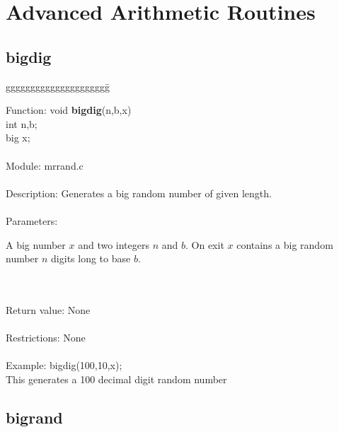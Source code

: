\section{Advanced Arithmetic Routines}

\subsection{bigdig}

\begin{tabbing}
ggggggggggggggggggggg\= \kill

      Function:      \>void {\bf bigdig}(n,b,x)  \\
                     \>int n,b; \\
                     \>big x;   \\
      \  \\
      Module:        \>mrrand.c \\
      \ \\
      Description:   \>Generates a big random number of given length.\\
      \ \\
      Parameters:    \>
                     \parbox[t]{3in}
                     {A big number $x$ and two integers $n$ and $b$. On 
                     exit $x$ contains a big random number $n$ digits long 
                     to base $b$.} \\
      \ \\
      Return value:  \>None \\
      \ \\
      Restrictions:  \>None \\
      \ \\
      Example:       \>bigdig(100,10,x);   \ \\
                     \>This generates a 100 decimal digit random number \\
\end{tabbing}


\subsection{bigrand}

